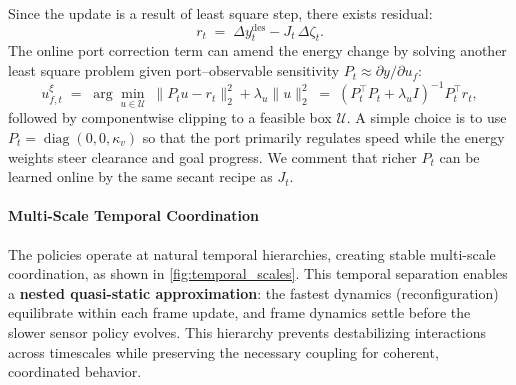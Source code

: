 Since the update is a result of least square step, there exists residual:
\[
r_t \;=\; \Delta y^{\mathrm{des}}_t - J_t\,\Delta\zeta_t.
\]
The online port correction term can amend the energy change by solving another least square problem given port–observable sensitivity $P_t\approx\partial y/\partial u_f$:
\[
u_{f,t}^{\xi}
\;=\;\arg\min_{u\in\mathcal U}\ \big\|P_t u - r_t\big\|_2^2+\lambda_u\|u\|_2^2
\;=\;(P_t^\top P_t+\lambda_u I)^{-1}P_t^\top r_t,
\]
followed by componentwise clipping to a feasible box $\mathcal U$.
A simple choice is to use $P_t=\operatorname{diag}(0,0,\kappa_v)$ so that the port primarily regulates speed while the energy weights steer clearance and goal progress. We comment that richer $P_t$ can be learned online by the same secant recipe as $J_t$.



\paragraph{Multi-Scale Temporal Coordination}
\label{subsec:temporal_coordination}

The policies operate at natural temporal hierarchies, creating stable multi-scale coordination, as shown in \cref{fig:temporal_scales}. This temporal separation enables a \textbf{nested quasi-static approximation}: the fastest dynamics (reconfiguration) equilibrate within each frame update, and frame dynamics settle before the slower sensor policy evolves.
This hierarchy prevents destabilizing interactions across timescales 
while preserving the necessary coupling for coherent, coordinated behavior.


